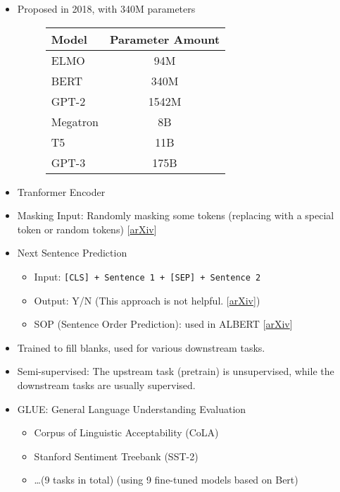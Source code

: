 \documentclass[11pt]{book}
\newcommand{\codeinline}[1]{\colorbox{gray!20!white}{\lstinline`#1`}}
\begin{document}
\begin{itemize}
    \item Proposed in 2018, with 340M parameters
    \begin{figure}[H]
        \centering
        \begin{tabular}{lc}
            \hline
            Model & Parameter Amount\\
            \hline
            ELMO & 94M\\
            BERT & 340M\\
            GPT-2 & 1542M\\
            Megatron & 8B\\
            T5 & 11B\\
            GPT-3 & 175B\\
            \hline
        \end{tabular}
    \end{figure}
    \item Tranformer Encoder
    \item Masking Input: Randomly masking some tokens (replacing with a special token or random tokens) [\href{https://arxiv.org/abs/1810.04805}{arXiv}]
    \item Next Sentence Prediction
    \begin{itemize}
        \item Input: \codeinline{[CLS] + Sentence 1 + [SEP] + Sentence 2}
        \item Output: Y/N (This approach is not helpful. [\href{https://arxiv.org/abs/1907.11692}{arXiv}])
        \item SOP (Sentence Order Prediction): used in ALBERT [\href{https://arxiv.org/abs/1909.11942}{arXiv}]
    \end{itemize}
    \item Trained to fill blanks, used for various downstream tasks.
    \item Semi-supervised: The upstream task (pretrain) is unsupervised, while the downstream tasks are usually supervised.
    \item GLUE: General Language Understanding Evaluation
    \begin{itemize}
        \item Corpus of Linguistic Acceptability (CoLA)
        \item Stanford Sentiment Treebank (SST-2)
        \item \dots (9 tasks in total) (using 9 fine-tuned models based on Bert)
    \end{itemize}
\end{itemize}
\end{document}

